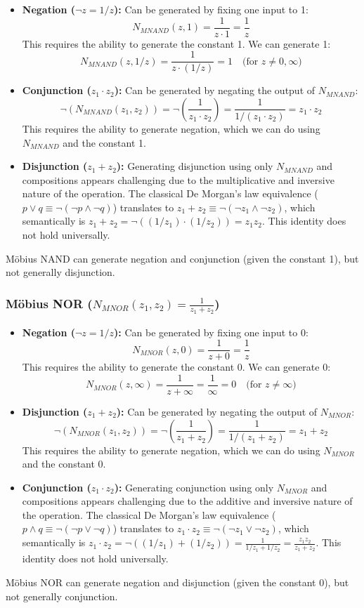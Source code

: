 	\begin{itemize}
		\item \textbf{Negation ($\neg z = 1/z$):} Can be generated by fixing one input to 1:
		$$N_{MNAND}(z, 1) = \frac{1}{z \cdot 1} = \frac{1}{z}$$
		This requires the ability to generate the constant 1. We can generate 1:
		$$N_{MNAND}(z, 1/z) = \frac{1}{z \cdot (1/z)} = 1 \quad \text{(for } z \neq 0, \infty)$$
		\item \textbf{Conjunction ($z_1 \cdot z_2$):} Can be generated by negating the output of $N_{MNAND}$:
		$$\neg(N_{MNAND}(z_1, z_2)) = \neg\left(\frac{1}{z_1 \cdot z_2}\right) = \frac{1}{1/(z_1 \cdot z_2)} = z_1 \cdot z_2$$
		This requires the ability to generate negation, which we can do using $N_{MNAND}$ and the constant 1.
		\item \textbf{Disjunction ($z_1 + z_2$):} Generating disjunction using only $N_{MNAND}$ and compositions appears challenging due to the multiplicative and inversive nature of the operation. The classical De Morgan's law equivalence ($p \vee q \equiv \neg(\neg p \wedge \neg q)$) translates to $z_1 + z_2 \equiv \neg(\neg z_1 \wedge \neg z_2)$, which semantically is $z_1 + z_2 = \neg((1/z_1) \cdot (1/z_2)) = z_1 z_2$. This identity does not hold universally.
	\end{itemize}
	M\"{o}bius NAND can generate negation and conjunction (given the constant 1), but not generally disjunction.

	\subsubsection{Möbius NOR ($N_{MNOR}(z_1, z_2) = \frac{1}{z_1 + z_2}$)}

	\begin{itemize}
		\item \textbf{Negation ($\neg z = 1/z$):} Can be generated by fixing one input to 0:
		$$N_{MNOR}(z, 0) = \frac{1}{z + 0} = \frac{1}{z}$$
		This requires the ability to generate the constant 0. We can generate 0:
		$$N_{MNOR}(z, \infty) = \frac{1}{z + \infty} = \frac{1}{\infty} = 0 \quad \text{(for } z \neq \infty)$$
		\item \textbf{Disjunction ($z_1 + z_2$):} Can be generated by negating the output of $N_{MNOR}$:
		$$\neg(N_{MNOR}(z_1, z_2)) = \neg\left(\frac{1}{z_1 + z_2}\right) = \frac{1}{1/(z_1 + z_2)} = z_1 + z_2$$
		This requires the ability to generate negation, which we can do using $N_{MNOR}$ and the constant 0.
		\item \textbf{Conjunction ($z_1 \cdot z_2$):} Generating conjunction using only $N_{MNOR}$ and compositions appears challenging due to the additive and inversive nature of the operation. The classical De Morgan's law equivalence ($p \wedge q \equiv \neg(\neg p \vee \neg q)$) translates to $z_1 \cdot z_2 \equiv \neg(\neg z_1 \vee \neg z_2)$, which semantically is $z_1 \cdot z_2 = \neg((1/z_1) + (1/z_2)) = \frac{1}{1/z_1 + 1/z_2} = \frac{z_1 z_2}{z_1 + z_2}$. This identity does not hold universally.
	\end{itemize}
	M\"{o}bius NOR can generate negation and disjunction (given the constant 0), but not generally conjunction.

